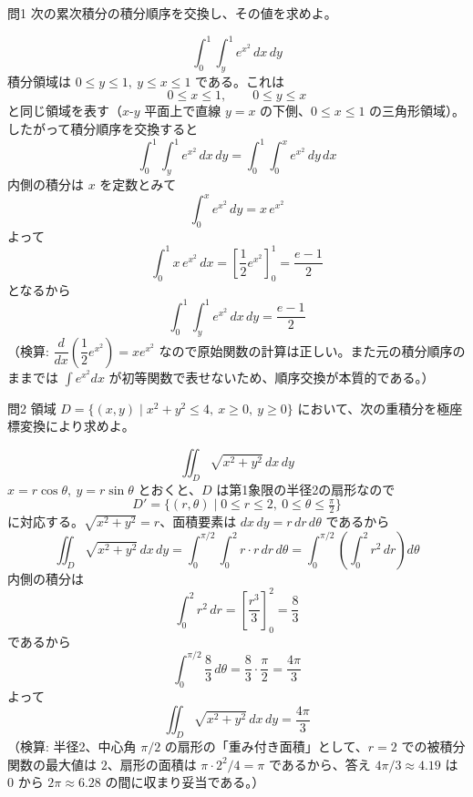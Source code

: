 \documentclass[a4paper,11pt]{article}
\begin{document}
\clearpage
\begin{mondaiboxS}{問1}
次の累次積分の積分順序を交換し、その値を求めよ。
\end{mondaiboxS}
\[
\int_{0}^{1}\int_{y}^{1} e^{x^{2}}\,dx\,dy
\]
\kaitou
積分領域は $0 \le y \le 1,\ y \le x \le 1$ である。これは
\[
0 \le x \le 1,\qquad 0 \le y \le x
\]
と同じ領域を表す（$x$-$y$ 平面上で直線 $y=x$ の下側、$0\le x\le1$ の三角形領域）。したがって積分順序を交換すると
\[
\int_{0}^{1}\int_{y}^{1} e^{x^{2}}\,dx\,dy = \int_{0}^{1}\int_{0}^{x} e^{x^{2}}\,dy\,dx
\]
内側の積分は $x$ を定数とみて
\[
\int_{0}^{x} e^{x^{2}}\,dy = x\,e^{x^{2}}
\]
よって
\[
\int_{0}^{1} x\,e^{x^{2}}\,dx = \left[\frac{1}{2}e^{x^{2}}\right]_{0}^{1} = \frac{e-1}{2}
\]
となるから
\[
\boxed{\; \int_{0}^{1}\int_{y}^{1} e^{x^{2}}\,dx\,dy = \frac{e-1}{2} \;}
\]
（検算: $\dfrac{d}{dx}\left(\dfrac{1}{2}e^{x^2}\right) = x e^{x^2}$ なので原始関数の計算は正しい。また元の積分順序のままでは $\int e^{x^2}dx$ が初等関数で表せないため、順序交換が本質的である。）

\clearpage
\begin{mondaiboxS}{問2}
領域 $D = \{(x,y) \mid x^{2} + y^{2} \le 4,\ x \ge 0,\ y \ge 0\}$ において、次の重積分を極座標変換により求めよ。
\end{mondaiboxS}
\[
\iint_{D} \sqrt{x^{2} + y^{2}}\,dx\,dy
\]
\kaitou
$x = r\cos\theta,\ y = r\sin\theta$ とおくと、$D$ は第1象限の半径2の扇形なので
\[
D' = \{(r,\theta) \mid 0 \le r \le 2,\ 0 \le \theta \le \tfrac{\pi}{2}\}
\]
に対応する。$\sqrt{x^2+y^2} = r$、面積要素は $dx\,dy = r\,dr\,d\theta$ であるから
\[
\iint_{D} \sqrt{x^{2}+y^{2}}\,dx\,dy = \int_{0}^{\pi/2}\int_{0}^{2} r \cdot r\,dr\,d\theta
= \int_{0}^{\pi/2}\left(\int_{0}^{2} r^{2}\,dr\right)d\theta
\]
内側の積分は
\[
\int_{0}^{2} r^{2}\,dr = \left[\frac{r^{3}}{3}\right]_{0}^{2} = \frac{8}{3}
\]
であるから
\[
\int_{0}^{\pi/2} \frac{8}{3}\,d\theta = \frac{8}{3}\cdot\frac{\pi}{2} = \frac{4\pi}{3}
\]
よって
\[
\boxed{\; \iint_{D} \sqrt{x^{2}+y^{2}}\,dx\,dy = \frac{4\pi}{3} \;}
\]
（検算: 半径2、中心角 $\pi/2$ の扇形の「重み付き面積」として、$r=2$ での被積分関数の最大値は $2$、扇形の面積は $\pi\cdot2^2/4=\pi$ であるから、答え $4\pi/3 \approx 4.19$ は $0$ から $2\pi\approx6.28$ の間に収まり妥当である。）
\end{document}
